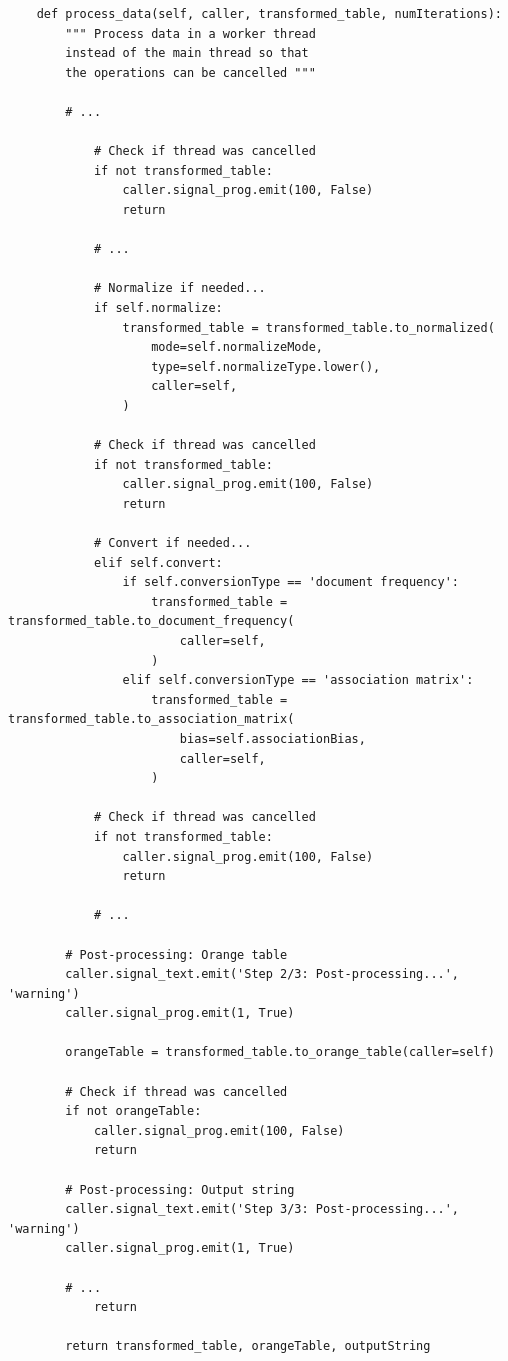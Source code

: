\documentclass{article}
\begin{document}
\begin{verbatim}
    def process_data(self, caller, transformed_table, numIterations):
        """ Process data in a worker thread
        instead of the main thread so that
        the operations can be cancelled """

        # ...

            # Check if thread was cancelled
            if not transformed_table:
                caller.signal_prog.emit(100, False)
                return

            # ...

            # Normalize if needed...
            if self.normalize:
                transformed_table = transformed_table.to_normalized(
                    mode=self.normalizeMode,
                    type=self.normalizeType.lower(),
                    caller=self,
                )
                
            # Check if thread was cancelled
            if not transformed_table:
                caller.signal_prog.emit(100, False)
                return

            # Convert if needed...
            elif self.convert:
                if self.conversionType == 'document frequency':
                    transformed_table = transformed_table.to_document_frequency(
                        caller=self,
                    )
                elif self.conversionType == 'association matrix':
                    transformed_table = transformed_table.to_association_matrix(
                        bias=self.associationBias,
                        caller=self,
                    )
                    
            # Check if thread was cancelled
            if not transformed_table:
                caller.signal_prog.emit(100, False)
                return

            # ...

        # Post-processing: Orange table
        caller.signal_text.emit('Step 2/3: Post-processing...', 'warning')
        caller.signal_prog.emit(1, True)

        orangeTable = transformed_table.to_orange_table(caller=self)
        
        # Check if thread was cancelled
        if not orangeTable:
            caller.signal_prog.emit(100, False)
            return
        
        # Post-processing: Output string
        caller.signal_text.emit('Step 3/3: Post-processing...', 'warning')
        caller.signal_prog.emit(1, True)

        # ...
            return
        
        return transformed_table, orangeTable, outputString

\end{verbatim}
\end{document}
